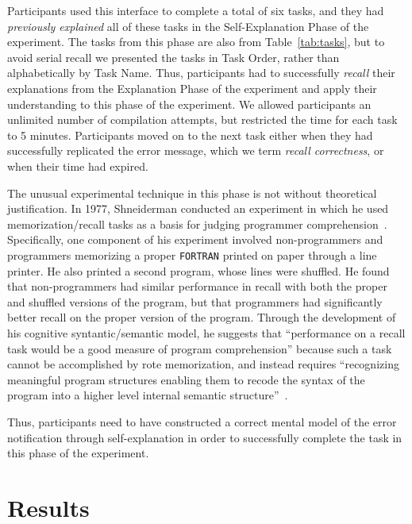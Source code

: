 \documentclass[conference]{IEEEtran}
\begin{document}
Participants used this interface to complete a total of six tasks, and they had \textit{previously explained} all of these tasks in the Self-Explanation Phase of the experiment. The tasks from this phase are also from Table~\ref{tab:tasks}, but to avoid serial recall we presented the tasks in Task Order, rather than alphabetically by Task Name. Thus, participants had to successfully \textit{recall} their explanations from the Explanation Phase of the experiment and apply their understanding to this phase of the experiment. We allowed participants an unlimited number of compilation attempts, but restricted the time for each task to 5 minutes. Participants moved on to the next task either when they had successfully replicated the error message, which we term \textit{recall correctness}, or when their time had expired.

The unusual experimental technique in this phase is not without theoretical justification. In 1977, Shneiderman conducted an experiment in which he used memorization/recall tasks as a basis for judging programmer comprehension~\cite{Shneiderman1977}. Specifically, one component of his experiment involved non-programmers and programmers memorizing a proper \texttt{FORTRAN} printed on paper through a line printer. He also printed a second program, whose lines were shuffled. He found that non-programmers had similar performance in recall with both the proper and shuffled versions of the program, but that programmers had significantly better recall on the proper version of the program. Through the development of his cognitive syntantic/semantic model, 
he suggests that ``performance on a recall task would be a good measure of program comprehension'' because such a task cannot be accomplished by rote memorization, and instead requires ``recognizing meaningful program structures enabling them to recode the syntax of the program into a higher level internal semantic structure''~\cite{Shneiderman1977}.

Thus, participants need to have constructed a correct mental model of the error notification through self-explanation in order to successfully complete the task in this phase of the experiment.

\section{Results}

\end{document}
